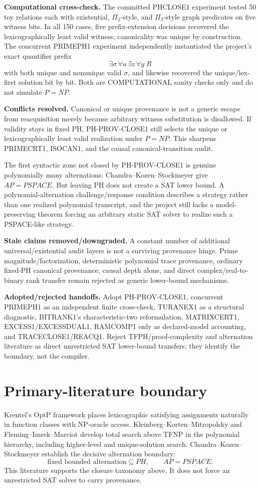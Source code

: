 \documentclass[11pt]{article}
\begin{document}
\textbf{Computational cross-check.}
The committed PHCLOSE1 experiment tested 50 toy relations each with existential, \(\Pi_2\)-style,
and \(\Pi_3\)-style graph predicates on five witness bits. In all 150 cases, five prefix-extension
decisions recovered the lexicographically least valid witness; canonicality was unique by construction.
The concurrent PRIMEPH1 experiment independently instantiated the project's exact quantifier prefix
\[
\exists\sigma\,\forall u\,\exists z\,\forall y\;R
\]
with both unique and nonunique valid \(\sigma\), and likewise recovered the unique/lex-first
solution bit by bit. Both are COMPUTATIONAL sanity checks only and do not simulate \(P=NP\).

\textbf{Conflicts resolved.}
Canonical or unique provenance is not a generic escape from reacquisition merely because arbitrary
witness substitution is disallowed. If validity stays in fixed PH, PH-PROV-CLOSE1 still selects the
unique or lexicographically least valid realization under \(P=NP\). This sharpens PRIMECRT1,
ISOCAN1, and the causal canonical-transition audit.

The first syntactic zone not closed by PH-PROV-CLOSE1 is genuine polynomially many alternations:
Chandra--Kozen--Stockmeyer give \(AP=PSPACE\). But leaving PH does not create a SAT lower bound.
A polynomial-alternation challenge/response condition describes a strategy rather than one realized
polynomial transcript, and the project still lacks a model-preserving theorem forcing an arbitrary
static SAT solver to realize such a PSPACE-like strategy.

\textbf{Stale claims removed/downgraded.}
A constant number of additional universal/existential audit layers is not a surviving provenance hinge.
Prime magnitude/factorization, deterministic polynomial trace provenance, ordinary fixed-PH canonical
provenance, causal depth alone, and direct complex/real-to-binary rank transfer remain rejected as
generic lower-bound mechanisms.

\textbf{Adopted/rejected handoffs.}
Adopt PH-PROV-CLOSE1, concurrent PRIMEPH1 as an independent finite cross-check, TURANEX1 as a structural
diagnostic, BITRANK1's characteristic-two reformulation, MATRIXCERT1, EXCESS1/EXCESSDUAL1, RAMCOMP1
only as declared-model accounting, and TRACECLOSE1/REACQ1. Reject TFPH/proof-complexity and
alternation literature as direct unrestricted SAT lower-bound transfers; they identify the boundary,
not the compiler.

\section*{Primary-literature boundary}
Krentel's OptP framework places lexicographic satisfying assignments naturally in function classes
with NP-oracle access. Kleinberg--Korten--Mitropolsky and Fleming--Imrek--Marciot develop total
search above TFNP in the polynomial hierarchy, including higher-level and unique-solution search.
Chandra--Kozen--Stockmeyer establish the decisive alternation boundary:
\[
\text{fixed bounded alternation}\subseteq PH,
\qquad
AP=PSPACE.
\]
This literature supports the closure taxonomy above. It does not force an unrestricted SAT solver
to carry provenance.
\end{document}
